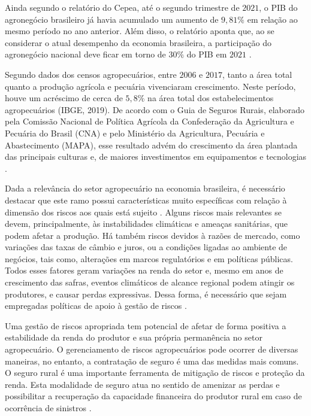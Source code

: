 \documentclass[12pt,a4paper]{article}
\begin{document}
Ainda segundo o relatório do Cepea, até o segundo trimestre de $2021$, o PIB do agronegócio brasileiro já havia acumulado um aumento de $9,81\%$ em relação ao mesmo período no ano anterior. Além disso, o relatório aponta que, ao se considerar o atual desempenho da economia brasileira, a participação do agronegócio nacional deve ficar em torno de $30\%$ do PIB em $2021$ \cite{cepea21}. 

Segundo dados dos censos agropecuários, entre $2006$ e $2017$, tanto a área total quanto a produção agrícola e pecuária vivenciaram crescimento. Neste período, houve um acréscimo de cerca de $5,8\%$ na área total dos estabelecimentos agropecuários (IBGE, 2019). De acordo com o Guia de Seguros Rurais, elaborado pela Comissão Nacional de Política Agrícola da Confederação da Agricultura e Pecuária do Brasil (CNA) e pelo Ministério da Agricultura, Pecuária e Abastecimento (MAPA), esse resultado advém do crescimento da área plantada das principais culturas e, de maiores investimentos em equipamentos e tecnologias \cite{guia_20}.

Dada a relevância do setor agropecuário na economia brasileira, é necessário destacar que este ramo possui características muito específicas com relação à dimensão dos riscos aos quais está sujeito \cite{burgo05}. Alguns riscos mais relevantes se devem, principalmente, às instabilidades climáticas e ameaças sanitárias, que podem afetar a produção. Há também riscos devidos à razões de mercado, como variações das taxas de câmbio e juros, ou a condições ligadas ao ambiente de negócios, tais como, alterações em marcos regulatórios e em políticas públicas. Todos esses fatores geram variações na renda do setor e, mesmo em anos de crescimento das safras, eventos climáticos de alcance regional podem atingir os produtores, e causar perdas expressivas. Dessa forma, é necessário que sejam empregadas políticas de apoio à gestão de riscos \cite{brasil21}. 

Uma gestão de riscos apropriada tem potencial de afetar de forma positiva a estabilidade da renda do produtor e sua própria permanência no setor agropecuário. O gerenciamento de riscos agropecuários pode ocorrer de diversas maneiras, no entanto, a contratação de seguro é uma das medidas mais comuns. O seguro rural é uma importante ferramenta de mitigação de riscos e proteção da renda. Esta modalidade de seguro atua no sentido de amenizar as perdas e possibilitar a recuperação da capacidade financeira do produtor rural em caso de ocorrência de sinistros \cite{brasil19b}.  
\end{document}
